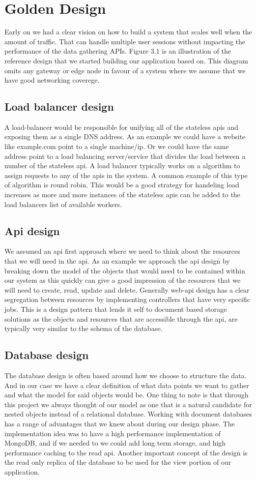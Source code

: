 \documentclass[]{uiophd}
\begin{document}
\section{Golden Design}
Early on we had a clear vision on how to build a system that scales well when the amount of traffic. That can handle multiple user sessions without impacting the performance of the data gathering APIs. Figure 3.1 is an illustration of the reference design that we started building our application based on. This diagram omits any gateway or edge node in favour of a system where we assume that we have good networking coverege.
\subsection{Load balancer design}
A load-balancer would be responsible for unifying all of the stateless apis and exposing them as a single DNS address. As an example we could have a website like example.com point to a single machine/ip. Or we could have the same address point to a load balancing server/service that divides the load between a number of the stateless api. A load balancer typically works on a algorithm to assign requests to any of the apis in the system. A common example of this type of algorithm is round robin. This would be a good strategy for handeling load increases as more and more instances of the stateless apis can be added to the load balancers list of available workers.
\subsection{Api design}
We assumed an api first approach where we need to think about the resources that we will need in the api. As an example we approach the api design by breaking down the model of the objects that would need to be contained within our system as this quickly can give a good impression of the resources that we will need to create, read, update and delete. Generally web-api design has a clear segregation between resources by implementing controllers that have very specific jobs. This is a design pattern that lends it self to document based storage solutions as the objects and resources that are accessible through the api, are typically very similar to the schema of the database.
\subsection{Database design}
The database design is often based around how we choose to structure the data. And in our case we have a clear definition of what data points we want to gather and what the model for said objects would be. One thing to note is that through this project we always thought of our model as one that is a natural candidate for nested objects instead of a relational database. Working with document databases has a range of advantages that we knew about during our design phase. The implementation idea was to have a high performance implementation of MongoDB, and if we needed to we could add long term storage, and high performance caching to the read api. Another important concept of the design is the read only replica of the database to be used for the view portion of our application.
\end{document}
